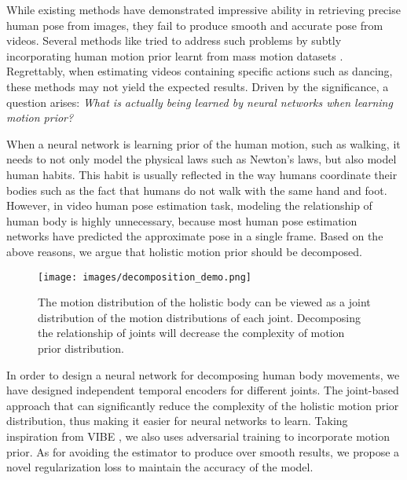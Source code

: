 \documentclass{svproc}
\begin{document}
While existing methods \cite{kanazawa2018end,kolotouros2019learning} have demonstrated impressive ability in retrieving precise human pose from images, they fail to produce smooth and accurate pose from videos. Several methods like \cite{kocabas2020vibe,luo20203d,rempe2021humor,yuan2022glamr} tried to address such problems by subtly incorporating human motion prior learnt from mass motion datasets \cite{li2021ai, mahmood2019amass}. 
Regrettably, when estimating videos containing specific actions such as dancing, these methods may not yield the expected results. Driven by the significance, a question arises:\textit{ What is actually being learned by neural networks when learning motion prior?}

\thispagestyle{firstpage}

\newpage

When a neural network is learning prior of the human motion, such as walking, it needs to not only model the physical laws such as Newton's laws, but also model human habits. This habit is usually reflected in the way humans coordinate their bodies such as the fact that humans do not walk with the same hand and foot. However, in video human pose estimation task, modeling the relationship of human body is highly unnecessary, because most human pose estimation networks have predicted the approximate pose in a single frame. Based on the above reasons, we argue that holistic motion prior should be decomposed.


\begin{figure}
    \centering
    \centerline{\texttt{[image: images/decomposition\_demo.png]}}
    \caption{The motion distribution of the holistic body can be viewed as a joint distribution of the motion distributions of each joint. Decomposing the relationship of joints will decrease the complexity of motion prior distribution.}
\end{figure}

In order to design a neural network for decomposing human body movements, we have designed independent temporal encoders for different joints. The joint-based approach that can significantly reduce the complexity of the holistic motion prior distribution, thus making it easier for neural networks to learn. Taking inspiration from VIBE \cite{kocabas2020vibe}, we also uses adversarial training to incorporate motion prior. As for avoiding the estimator to produce over smooth results, we propose a novel regularization loss to maintain the accuracy of the model.
\end{document}
